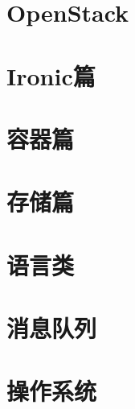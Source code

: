 \documentclass[b5paper]{book}
\newcommand{\colorunderlineref}[1]{\hypersetup{linkcolor=RedOrange}\nameref{#1}\hypersetup{linkcolor=black}}
\newenvironment{sourcecode}{\captionsetup{type=listing}}{}
\newenvironment{code-block}[1]
 {\VerbatimEnvironment
  \begin{mdframed}[topline=false, bottomline=false, leftline=false,
                   rightline=false, backgroundcolor=lbcolor,
                   userdefinedwidth=\textwidth]
  \begin{verbatim}}
 {\end{verbatim}\end{mdframed}}
\begin{document}
\newpage

\frontmatter
{
  \renewcommand*\contentsname{目录}
  \tableofcontents%
  \thispagestyle{empty}
}

\mainmatter

%

\part{OpenStack}

\part{Ironic篇}





\part{容器篇}




\part{存储篇}


\part{语言类}





\part{消息队列}

\part{操作系统}



\end{document}
